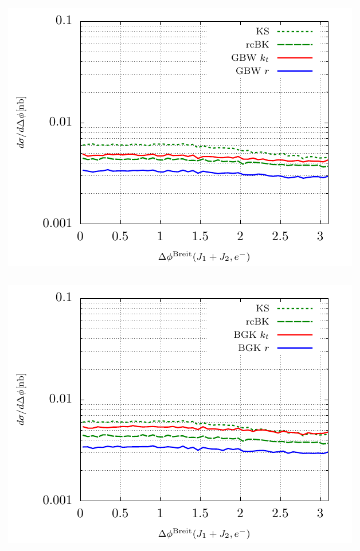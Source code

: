 \documentclass[11pt]{article}
\begin{document}
\begin{figure}[p]
	\begin{subfigure}{0.5\textwidth}
	\includegraphics[width=\textwidth]{plots/plotGBW1} 
	\end{subfigure}
	\begin{subfigure}{0.5\textwidth}
	\includegraphics[width=\textwidth]{plots/plotBGK1} 
	\end{subfigure}
	\begin{subfigure}{0.5\textwidth}

\end{subfigure}
\end{figure}
\end{document}
